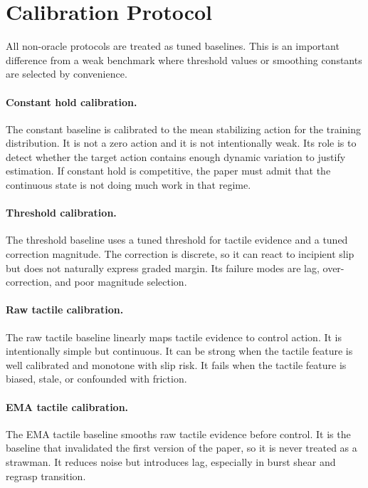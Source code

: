 \documentclass{article}
\begin{document}
\section{Calibration Protocol}

All non-oracle protocols are treated as tuned baselines. This is an important difference from a weak benchmark where threshold values or smoothing constants are selected by convenience.

\paragraph{Constant hold calibration.}
The constant baseline is calibrated to the mean stabilizing action for the training distribution. It is not a zero action and it is not intentionally weak. Its role is to detect whether the target action contains enough dynamic variation to justify estimation. If constant hold is competitive, the paper must admit that the continuous state is not doing much work in that regime.

\paragraph{Threshold calibration.}
The threshold baseline uses a tuned threshold for tactile evidence and a tuned correction magnitude. The correction is discrete, so it can react to incipient slip but does not naturally express graded margin. Its failure modes are lag, over-correction, and poor magnitude selection.

\paragraph{Raw tactile calibration.}
The raw tactile baseline linearly maps tactile evidence to control action. It is intentionally simple but continuous. It can be strong when the tactile feature is well calibrated and monotone with slip risk. It fails when the tactile feature is biased, stale, or confounded with friction.

\paragraph{EMA tactile calibration.}
The EMA tactile baseline smooths raw tactile evidence before control. It is the baseline that invalidated the first version of the paper, so it is never treated as a strawman. It reduces noise but introduces lag, especially in burst shear and regrasp transition.
\end{document}
